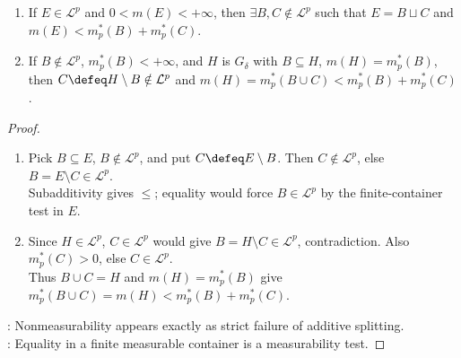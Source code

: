 \begin{corollary} \label{cor:nonadditive-decompositions-from-nonmeasurable-sets} 
\begin{enumerate}[label=(\roman*)]
\setlength{\itemsep}{0pt}
\item If $E\in\mathcal{L}^p$ and $0<m(E)<+\infty$, then $\exists B,C\notin\mathcal{L}^p$ such that $E=B\sqcup C$ and $m(E)<m_p^\ast(B)+m_p^\ast(C)$.
\item If $B\notin\mathcal{L}^p$, $m_p^\ast(B)<+\infty$, and $H$ is $G_\delta$ with $B\subseteq H$, $m(H)=m_p^\ast(B)$,\\
then $C\defeq H\setminus B\notin\mathcal{L}^p$ and $m(H)=m_p^\ast(B\cup C)<m_p^\ast(B)+m_p^\ast(C)$.
\end{enumerate}
\begin{proof}
\begin{enumerate}[label=(\roman*)]
\setlength{\itemsep}{0pt}
\item Pick $B\subseteq E$, $B\notin\mathcal{L}^p$, and put $C\defeq E\setminus B$. Then $C\notin\mathcal{L}^p$, else $B=E\setminus C\in\mathcal{L}^p$.\\
Subadditivity gives $\leq$; equality would force $B\in\mathcal{L}^p$ by the finite-container test in $E$.
\item Since $H\in\mathcal{L}^p$, $C\in\mathcal{L}^p$ would give $B=H\setminus C\in\mathcal{L}^p$, contradiction. Also $m_p^\ast(C)>0$, else $C\in\mathcal{L}^p$.\\
Thus $B\cup C=H$ and $m(H)=m_p^\ast(B)$ give $m_p^\ast(B\cup C)=m(H)<m_p^\ast(B)+m_p^\ast(C)$.
\end{enumerate}
: Nonmeasurability appears exactly as strict failure of additive splitting.\\
: Equality in a finite measurable container is a measurability test.
\end{proof}
\end{corollary}

